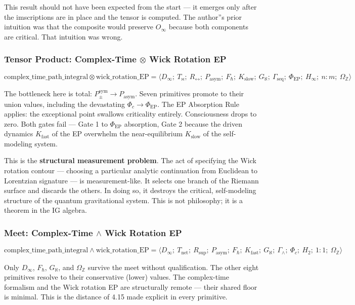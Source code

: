 \documentclass[12pt,a4paper]{article}
\begin{document}
This result should not have been expected from the start --- it emerges only after the imscriptions are in place and the tensor is computed. The author''s prior intuition was that the composite would preserve $O_{\infty}$ because both components are critical. That intuition was wrong.

\subsubsection{Tensor Product: Complex-Time $\otimes$ Wick Rotation EP}

\[\text{complex\_time\_path\_integral} \otimes \text{wick\_rotation\_EP} = \langle D_{\infty};\ T_{\bowtie};\ R_{\leftrightarrow};\ P_{\text{asym}};\ F_{\hbar};\ K_{\text{slow}};\ G_{\aleph};\ \Gamma_{\text{seq}};\ \Phi_{\text{EP}};\ H_{\infty};\ n{:}m;\ \Omega_\mathbb{Z} \rangle\]

The bottleneck here is total: $P_{\pm}^{\text{sym}} \to P_{\text{asym}}$. Seven primitives promote to their union values, including the devastating $\Phi_c \to \Phi_{\text{EP}}$. The EP Absorption Rule applies: the exceptional point swallows criticality entirely. Consciousness drops to zero. Both gates fail --- Gate 1 to $\Phi_{\text{EP}}$ absorption, Gate 2 because the driven dynamics $K_{\text{fast}}$ of the EP overwhelm the near-equilibrium $K_{\text{slow}}$ of the self-modeling system.

This is the \textbf{structural measurement problem}. The act of specifying the Wick rotation contour --- choosing a particular analytic continuation from Euclidean to Lorentzian signature --- is measurement-like. It selects one branch of the Riemann surface and discards the others. In doing so, it destroys the critical, self-modeling structure of the quantum gravitational system. This is not philosophy; it is a theorem in the IG algebra.

\subsubsection{Meet: Complex-Time $\wedge$ Wick Rotation EP}

\[\text{complex\_time\_path\_integral} \wedge \text{wick\_rotation\_EP} = \langle D_{\infty};\ T_{\text{net}};\ R_{\text{sup}};\ P_{\text{asym}};\ F_{\hbar};\ K_{\text{fast}};\ G_{\aleph};\ \Gamma_{\wedge};\ \Phi_c;\ H_2;\ 1{:}1;\ \Omega_\mathbb{Z} \rangle\]

Only $D_{\infty}$, $F_{\hbar}$, $G_{\aleph}$, and $\Omega_\mathbb{Z}$ survive the meet without qualification. The other eight primitives resolve to their conservative (lower) values. The complex-time formalism and the Wick rotation EP are structurally remote --- their shared floor is minimal. This is the distance of 4.15 made explicit in every primitive.
\end{document}
